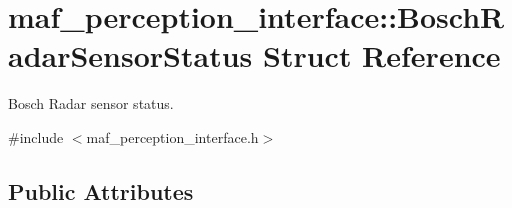 \hypertarget{structmaf__perception__interface_1_1BoschRadarSensorStatus}{}\section{maf\+\_\+perception\+\_\+interface\+:\+:Bosch\+Radar\+Sensor\+Status Struct Reference}
\label{structmaf__perception__interface_1_1BoschRadarSensorStatus}


Bosch Radar sensor status.  




{\ttfamily \#include $<$maf\+\_\+perception\+\_\+interface.\+h$>$}

\subsection*{Public Attributes}
